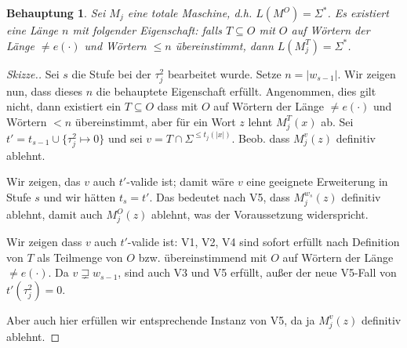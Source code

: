 \documentclass[nofonts]{uebung}
\newtheorem{claim}[theorem]{Behauptung}
\begin{document}
\begin{claim}
    Sei $M_j$ eine totale Maschine, d.h. $L(M^O)=\Sigma^*$.
    Es existiert eine Länge $n$ mit folgender Eigenschaft: 
    falls $T\subseteq O$ mit $O$ auf Wörtern der Länge $\neq e(\cdot)$ und Wörtern $\leq n$ übereinstimmt, dann $L(M_j^T)=\Sigma^*$.
\end{claim}
\begin{proof}[Skizze.]
    Sei $s$ die Stufe bei der $\tau^2_j$ bearbeitet wurde. Setze $n=|w_{s-1}|$.
    Wir zeigen nun, dass dieses $n$ die behauptete Eigenschaft erfüllt.
    Angenommen, dies gilt nicht, dann existiert ein $T\subseteq O$ dass mit $O$ auf Wörtern der Länge $\neq e(\cdot)$ und Wörtern $<n$ übereinstimmt, aber für ein Wort $z$ lehnt $M_j^T(x)$ ab.
    Sei $t'=t_{s-1}\cup \{\tau^2_j\mapsto 0\}$ und sei $v=T\cap\Sigma^{\leq t_j(|x|)}$. 
    Beob. dass $M_j^v(z)$ definitiv ablehnt.

    Wir zeigen, das $v$ auch $t'$-valide ist;  damit wäre $v$ eine geeignete Erweiterung in Stufe $s$ und wir hätten $t_s=t'$. 
    Das bedeutet nach V5, dass $M_j^{w_s}(z)$ definitiv ablehnt, damit auch $M_j^O(z)$ ablehnt, was der Voraussetzung widerspricht.

    Wir zeigen dass $v$ auch $t'$-valide ist:
    V1, V2, V4 sind sofort erfüllt nach Definition von $T$ als Teilmenge von $O$ bzw. übereinstimmend mit $O$ auf Wörtern der Länge $\neq e(\cdot)$.
    Da $v\sqsupsetneq w_{s-1}$, sind auch V3 und V5 erfüllt, außer der neue V5-Fall von $t'(\tau_j^2)=0$.

    Aber auch hier erfüllen wir entsprechende Instanz von V5, da ja $M_j^v(z)$ definitiv ablehnt.
\end{proof}
\end{document}

